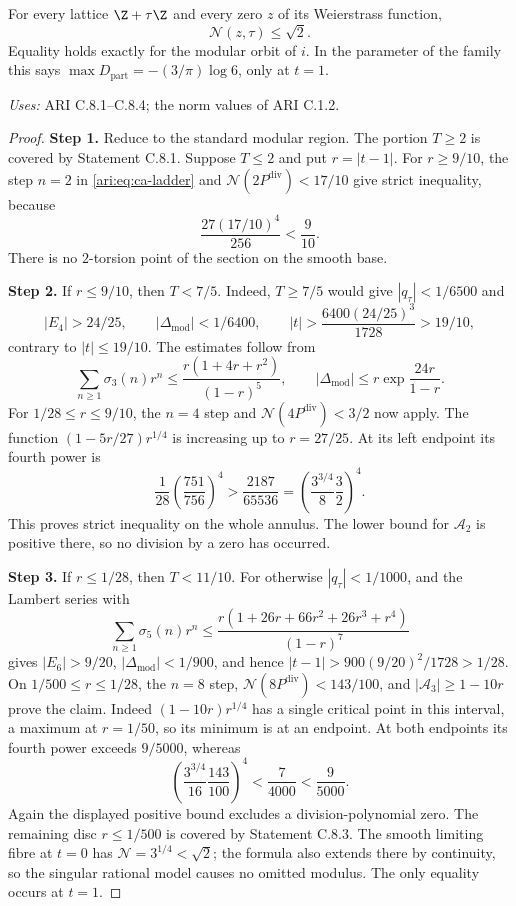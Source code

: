 \begin{proposition}\label{ari:C.8.5}
For every lattice $\Z+\tau\Z$ and every zero $z$ of its
Weierstrass function,
\[
 \mathcal N(z,\tau)\le\sqrt2.
\]
Equality holds exactly for the modular orbit of $i$.
In the parameter of the family this says
$\max D_{\mathrm{part}}=-(3/\pi)\log6$, only at $t=1$.
\end{proposition}
\noindent\textit{Uses:} ARI C.8.1--C.8.4; the norm values of ARI C.1.2.\par
\begin{proof}
\noindent\textbf{Step 1.} Reduce to the standard modular region. The portion $T\ge2$
is covered by Statement C.8.1. Suppose $T\le2$ and put
$r=|t-1|$. For $r\ge9/10$, the step $n=2$ in
\eqref{ari:eq:ca-ladder} and $\mathcal N(2P^{\mathrm{div}})<17/10$ give strict inequality,
because
\[
 \frac{27(17/10)^4}{256}<\frac9{10}.
\]
There is no $2$-torsion point of the section on the smooth base.


\noindent\textbf{Step 2.} If $r\le9/10$, then $T<7/5$. Indeed, $T\ge7/5$ would give
$|q_\tau|<1/6500$ and
\[
 |E_4|>24/25,\qquad |\Delta_{\mathrm{mod}}|<1/6400,
 \qquad |t|>\frac{6400(24/25)^3}{1728}>19/10,
\]
contrary to $|t|\le19/10$. The estimates follow from
\[
 \sum_{n\ge1}\sigma_3(n)r^n
 \le\frac{r(1+4r+r^2)}{(1-r)^5},\qquad
 |\Delta_{\mathrm{mod}}|\le r\exp\frac{24r}{1-r}.
\]
For $1/28\le r\le9/10$, the $n=4$ step and
$\mathcal N(4P^{\mathrm{div}})<3/2$ now apply. The function
$(1-5r/27)r^{1/4}$ is increasing up to $r=27/25$.
At its left endpoint its fourth power is
\[
 \frac1{28}\left(\frac{751}{756}\right)^4
 >\frac{2187}{65536}
 =\left(\frac{3^{3/4}}8\frac32\right)^4.
\]
This proves strict inequality on the whole annulus. The lower
bound for $\mathcal A_2$ is positive there, so no division by a zero has
occurred.


\noindent\textbf{Step 3.} If $r\le1/28$, then $T<11/10$. For otherwise $|q_\tau|<1/1000$,
and the Lambert series with
\[
 \sum_{n\ge1}\sigma_5(n)r^n
 \le\frac{r(1+26r+66r^2+26r^3+r^4)}{(1-r)^7}
\]
gives $|E_6|>9/20$, $|\Delta_{\mathrm{mod}}|<1/900$, and hence
$|t-1|>900(9/20)^2/1728>1/28$.
On $1/500\le r\le1/28$, the $n=8$ step,
$\mathcal N(8P^{\mathrm{div}})<143/100$, and $|\mathcal A_3|\ge1-10r$ prove the claim.
Indeed $(1-10r)r^{1/4}$ has a single critical point in this
interval, a maximum at $r=1/50$, so its minimum is at an endpoint.
At both endpoints its fourth power exceeds $9/5000$, whereas
\[
 \left(\frac{3^{3/4}}{16}\frac{143}{100}\right)^4
 <\frac7{4000}<\frac9{5000}.
\]
Again the displayed positive bound excludes a division-polynomial
zero. The remaining disc $r\le1/500$ is covered by Statement
C.8.3. The smooth limiting fibre at $t=0$ has
$\mathcal N=3^{1/4}<\sqrt2$; the formula also extends there by
continuity, so the singular rational model causes no omitted
modulus. The only equality occurs at $t=1$.
\end{proof}

